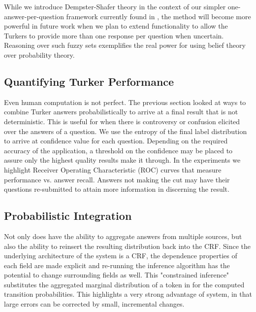 While we introduce Dempster-Shafer theory in the context of our simpler one-answer-per-question framework currently found in \sysName , the method will become more powerful in future work when we plan to extend functionality to allow the Turkers to provide more than one response per question when uncertain.  Reasoning over such fuzzy sets exemplifies the real power for using belief theory over probability theory.

\subsection{Quantifying Turker Performance}

Even human computation is not perfect.  The previous section looked at ways to combine Turker answers probabilistically to arrive at a final result that is not deterministic.  This is useful for when there is controversy or confusion elicited over the answers of a question.  We use the entropy of the final label distribution to arrive at confidence value for each question.  Depending on the required accuracy of the application, a threshold on the confidence may be placed to assure only the highest quality results make it through.  In the experiments we highlight Receiver Operating Characteristic (ROC) curves that measure performance vs. answer recall.  Answers not making the cut may have their questions re-submitted to attain more information in discerning the result. 

\subsection{Probabilistic Integration}

Not only does \sysName have the ability to aggregate answers from multiple sources, but also the ability to reinsert the resulting distribution back into the CRF. Since the underlying architecture of the system is a CRF, the dependence properties of each field are made explicit and re-running the inference algorithm has the potential to change surrounding fields as well.  This "constrained inference" substitutes the aggregated marginal distribution of a token in for the computed transition probabilities.  This highlights a very strong advantage of \sysName system, in that large errors can be corrected by small, incremental changes.

